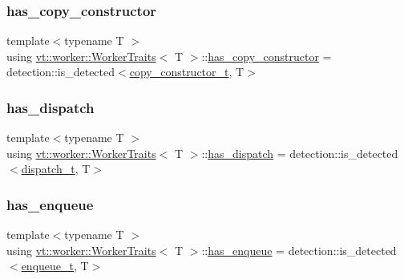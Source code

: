 \subsubsection{\texorpdfstring{has\+\_\+copy\+\_\+constructor}{has\_copy\_constructor}}
{\footnotesize\ttfamily template$<$typename T $>$ \\
using \hyperlink{structvt_1_1worker_1_1_worker_traits}{vt\+::worker\+::\+Worker\+Traits}$<$ T $>$\+::\hyperlink{structvt_1_1worker_1_1_worker_traits_a426f21bc7d1913681a26c10b58ee5d0b}{has\+\_\+copy\+\_\+constructor} =  detection\+::is\+\_\+detected$<$\hyperlink{structvt_1_1worker_1_1_worker_traits_a5018e778cb47740877e26c016a077e78}{copy\+\_\+constructor\+\_\+t}, T$>$}

\mbox{\label{structvt_1_1worker_1_1_worker_traits_adb7da9b18b2db529e85ed5a53ca0b0ea}} 
\subsubsection{\texorpdfstring{has\+\_\+dispatch}{has\_dispatch}}
{\footnotesize\ttfamily template$<$typename T $>$ \\
using \hyperlink{structvt_1_1worker_1_1_worker_traits}{vt\+::worker\+::\+Worker\+Traits}$<$ T $>$\+::\hyperlink{structvt_1_1worker_1_1_worker_traits_adb7da9b18b2db529e85ed5a53ca0b0ea}{has\+\_\+dispatch} =  detection\+::is\+\_\+detected$<$\hyperlink{structvt_1_1worker_1_1_worker_traits_ae3d04fe828e40c570a63b969b982e5d4}{dispatch\+\_\+t}, T$>$}

\mbox{\label{structvt_1_1worker_1_1_worker_traits_acca4e6684b4853e34e9d586256968cb6}} 
\subsubsection{\texorpdfstring{has\+\_\+enqueue}{has\_enqueue}}
{\footnotesize\ttfamily template$<$typename T $>$ \\
using \hyperlink{structvt_1_1worker_1_1_worker_traits}{vt\+::worker\+::\+Worker\+Traits}$<$ T $>$\+::\hyperlink{structvt_1_1worker_1_1_worker_traits_acca4e6684b4853e34e9d586256968cb6}{has\+\_\+enqueue} =  detection\+::is\+\_\+detected$<$\hyperlink{structvt_1_1worker_1_1_worker_traits_a017de8e435dfce71e241f5288e199454}{enqueue\+\_\+t}, T$>$}

